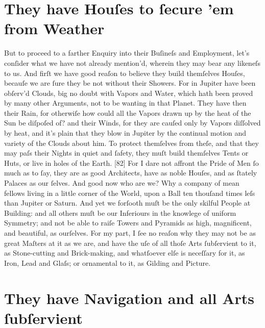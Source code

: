 \documentclass[letterpaper]{book}
\begin{document}
\section{They have Houſes to ſecure 'em from Weather}

But to proceed to a farther Enquiry into their Buſineſs and Employment,
let's conſider what we have not already mention'd, wherein they may bear any
likeneſs to us. And firſt we have good reaſon to believe they build
themſelves Houſes, becauſe we are ſure they be not without their Showers.
For in Jupiter have been obſerv'd Clouds, big no doubt with Vapors and
Water, which hath been proved by many other Arguments, not to be wanting in
that Planet. They have then their Rain, for otherwiſe how could all the
Vapors drawn up by the heat of the Sun be diſpoſed of? and their Winds, for
they are cauſed only by Vapors diſſolved by heat, and it's plain that they
blow in Jupiter by the continual motion and variety of the Clouds about him.
To protect themſelves from theſe, and that they may paſs their Nights in
quiet and ſafety, they muſt build themſelves Tents or Huts, or live in holes
of the Earth. [82] For I dare not affront the Pride of Men ſo much as to
ſay, they are as good Architects, have as noble Houſes, and as ſtately
Palaces as our ſelves. And good now who are we? Why a company of mean
fellows living in a little corner of the World, upon a Ball ten thouſand
times leſs than Jupiter or Saturn. And yet we forſooth muſt be the only
skilful People at Building: and all others muſt be our Inferiours in the
knowlege of uniform Symmetry; and not be able to raiſe Towers and Pyramids
as high, magnificent, and beautiful, as ourſelves. For my part, I ſee no
reaſon why they may not be as great Maſters at it as we are, and have the
uſe of all thoſe Arts ſubſervient to it, as Stone-cutting and Brick-making,
and whatſoever elſe is neceſſary for it, as Iron, Lead and Glaſs; or
ornamental to it, as Gilding and Picture.


\section{They have Navigation and all Arts ſubſervient}
\end{document}

